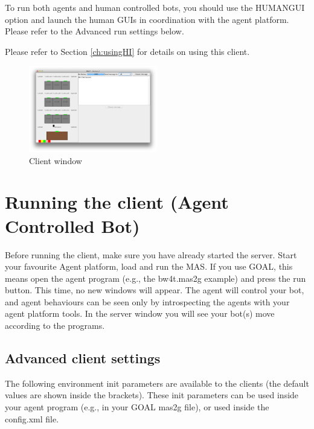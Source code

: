 \documentclass[11pt,a4paper]{article}
\begin{document}
To run both agents and human controlled bots, you should use the HUMANGUI option and launch the human GUIs in coordination with the agent platform. Please refer to the Advanced run settings below.

Please refer to Section  \ref{ch:usingHI} for details on using this client.

\begin{figure}[!h]
\begin{center}
  \includegraphics[width=0.5\textwidth]{HumanPlayerGUI/hpg.png}
  \caption{Client window}\label{fig:Client}
\end{center}
\end{figure}


\section{Running the client (Agent Controlled Bot)}
Before running the client, make sure you have already started the server. Start your favourite Agent platform, load and run the MAS. If you use GOAL, this means open the agent program (e.g., the bw4t.mas2g example) and press the run button. This time, no new windows will appear. The agent will control your bot,  and agent behaviours can be seen only by introspecting the agents with your agent platform tools. In the server window you will see your bot(s) move according to the programs.

\subsection{Advanced client settings}
\label{sec:clientadvancedrunsettings}
The following environment init parameters are available to the clients (the default values are shown inside the brackets). These init parameters can be used inside your agent program (e.g., in your GOAL mas2g file), or used inside the config.xml file. 
\end{document}
